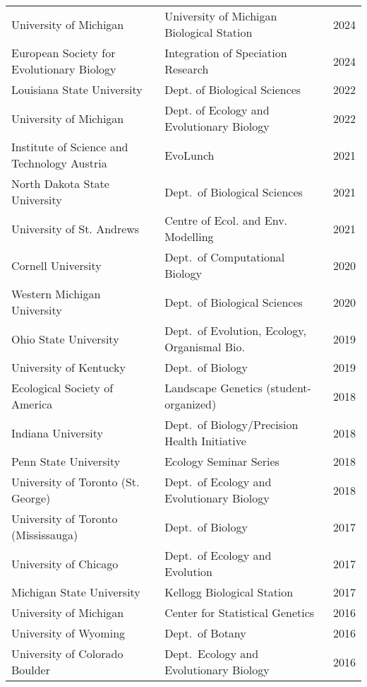 \documentclass{gbcv}
\begin{document}
\begin{longtable}{>{\everypar{\hangindent1cm}}p{}p{}p{}}
%
University of Michigan & University of Michigan Biological Station & \hfill 2024\\
%
European Society for Evolutionary Biology & Integration of Speciation Research & \hfill 2024\\
%
Louisiana State University & Dept. of Biological Sciences & \hfill 2022 \\
%
University of Michigan & Dept. of Ecology and Evolutionary Biology & \hfill 2022 \\
%
Institute of Science and Technology Austria & EvoLunch & \hfill 2021 \\
%
North Dakota State University & Dept.\ of Biological Sciences & \hfill 2021 \\
%
University of St. Andrews & Centre of Ecol. and Env. Modelling & \hfill 2021 \\
%
Cornell University & Dept.\ of Computational Biology & \hfill 2020 \\
%
Western Michigan University & Dept.\ of Biological Sciences & \hfill 2020 \\
%
Ohio State University & Dept.\ of Evolution, Ecology, Organismal Bio. & \hfill 2019 \\
%
University of Kentucky & Dept.\ of Biology & \hfill 2019 \\
%
Ecological Society of America & Landscape Genetics (student-organized) & \hfill 2018 \\
%
Indiana University & Dept.\ of Biology/Precision Health Initiative & \hfill 2018 \\
%
Penn State University & Ecology Seminar Series & \hfill 2018 \\
%
University of Toronto (St. George) & Dept.\ of Ecology and Evolutionary Biology & \hfill 2018 \\
%
University of Toronto (Mississauga) & Dept.\ of Biology & \hfill 2017 \\
%
University of Chicago & Dept.\ of Ecology and Evolution & \hfill 2017 \\
%
Michigan State University & Kellogg Biological Station & \hfill 2017 \\
%
University of Michigan & Center for Statistical Genetics & \hfill 2016 \\
%
University of Wyoming & Dept.\ of Botany & \hfill 2016 \\
%
University of Colorado Boulder & Dept.\ Ecology and Evolutionary Biology & \hfill 2016 \\

\end{longtable}
\end{document}
